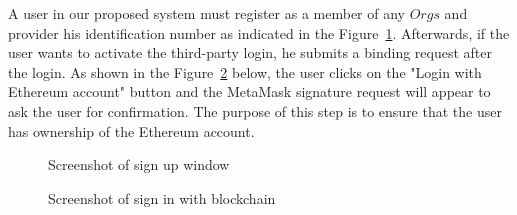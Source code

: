A user in our proposed system must register as a member of any \(Orgs\) and provider his identification number as indicated in the Figure~\ref{fig:signup}. Afterwards, if the user wants to activate the third-party login, he submits a binding request after the login. As shown in the Figure~\ref{fig:signinblockchain} below, the user clicks on the "Login with Ethereum account" button and the MetaMask signature request will appear to ask the user for confirmation. The purpose of this step is to ensure that the user has ownership of the Ethereum account.
\begin{figure}[h]
    \centering
    \caption{{\footnotesize Screenshot of sign up window}}
    \label{fig:signup}
\end{figure}

\begin{figure}[h]
    \centering
    \caption{{\footnotesize Screenshot of sign in with blockchain}}
    \label{fig:signinblockchain}
\end{figure}
\clearpage
\newpage

